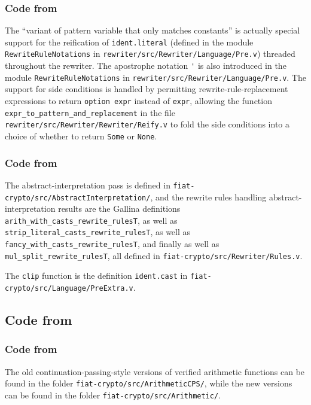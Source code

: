 \documentclass[a4paper,USenglish,cleveref,autoref,thm-restate]{lipics-v2021}
\begin{document}
\begin{minipage}[t][1cm]{\textwidth}
\subsubsection{Code from }

The ``variant of pattern variable that only matches constants'' is actually special support for the reification of \verb|ident.literal| (defined in the module \verb|RewriteRuleNotations| in \texttt{rewriter/src/Rewriter/Language/Pre.v}) threaded throughout the rewriter.
The apostrophe notation \verb|'| is also introduced in the module \verb|RewriteRuleNotations| in \texttt{rewriter/src/Rewriter/Language/Pre.v}.
The support for side conditions is handled by permitting rewrite-rule-replacement expressions to return \verb|option expr| instead of \verb|expr|, allowing the function \verb|expr_to_pattern_and_replacement| in the file \texttt{rewriter/src/Rewriter/Rewriter/Reify.v} to fold the side conditions into a choice of whether to return \verb|Some| or \verb|None|.

\subsubsection{Code from }

The abstract-interpretation pass is defined in \texttt{fiat-crypto/src/AbstractInterpretation/}, and the rewrite rules handling abstract-interpretation results are the Gallina definitions \verb|arith_with_casts_rewrite_rulesT|, as well as \verb|strip_literal_casts_rewrite_rulesT|, as well as \verb|fancy_with_casts_rewrite_rulesT|, and finally as well as \verb|mul_split_rewrite_rulesT|, all defined in \texttt{fiat-crypto/src/Rewriter/Rules.v}.

The \verb|clip| function is the definition \verb|ident.cast| in \texttt{fiat-crypto/src/Language/PreExtra.v}.

\subsection{Code from }

\subsubsection{Code from }
The old continuation-passing-style versions of verified arithmetic functions can be found in the folder \texttt{fiat-crypto/src/ArithmeticCPS/}, while the new versions can be found in the folder \texttt{fiat-crypto/src/Arithmetic/}.


\end{minipage}
\end{document}
